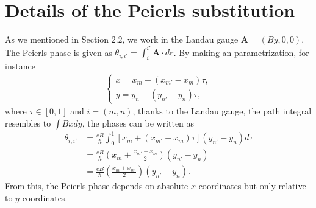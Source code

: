 \documentclass{report}
\begin{document}
\chapter{Details of the Peierls substitution} \label{appendix B}
As we mentioned in Section 2.2, we work in the Landau gauge $\mathbf{A} = (By,0,0)$. The Peierls phase is given as $\theta_{i,i'} = \int_{i}^{i'}\mathbf{A} \cdot d\mathbf{r}$. By making an parametrization, for instance
\begin{gather}
	\begin{cases}
		x = x_{m} + (x_{m'} - x_{m}) \tau, \\
		y = y_{n} + (y_{n'} - y_{n}) \tau,
	\end{cases}
\end{gather}
where $\tau \in \left[0,1\right]$ and $i = (m,n)$, thanks to the Landau gauge, the path integral resembles to $\int Bx dy$, the phases can be written as
\begin{equation}
	\begin{aligned}
		\theta_{i,i'} & = \frac{eB}{\hbar} \int_{0}^{1} \left[ x_{m} + (x_{m'} - x_{m}) \tau \right] (y_{n'} - y_{n}) d\tau \\
		& = \frac{eB}{\hbar}(x_{m} + \frac{x_{m'} - x_{m}}{2})(y_{n'} - y_{n})                                \\
		& = \frac{eB}{\hbar}\left(\frac{x_{m} + x_{m'}}{2}\right)(y_{n'} - y_{n}).
	\end{aligned}
\end{equation}
From this, the Peierls phase depends on absolute $x$ coordinates but only relative to $y$ coordinates.
\end{document}

